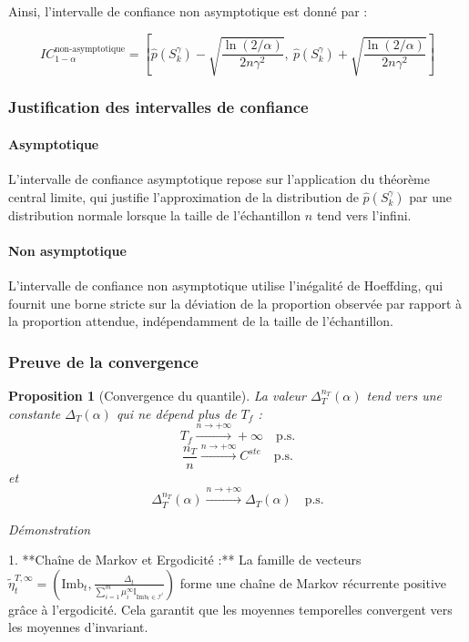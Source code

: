\documentclass[12pt,a4paper]{article}
\newtheorem{proposition}[theorem]{Proposition}
\theoremstyle{definition}
\theoremstyle{remark}
\begin{document}
Ainsi, l'intervalle de confiance non asymptotique est donné par :

$$
IC_{1 - \alpha}^{\text{non-asymptotique}} = \left[ \hat{p}(S_k^{\gamma}) - \sqrt{\frac{\ln(2/\alpha)}{2 n \gamma^2}}, \ \hat{p}(S_k^{\gamma}) + \sqrt{\frac{\ln(2/\alpha)}{2 n \gamma^2}} \right]
$$

\subsubsection{Justification des intervalles de confiance}

\paragraph{Asymptotique} L'intervalle de confiance asymptotique repose sur l'application du théorème central limite, qui justifie l'approximation de la distribution de $\hat{p}(S_k^{\gamma})$ par une distribution normale lorsque la taille de l'échantillon $n$ tend vers l'infini.

\paragraph{Non asymptotique} L'intervalle de confiance non asymptotique utilise l'inégalité de Hoeffding, qui fournit une borne stricte sur la déviation de la proportion observée par rapport à la proportion attendue, indépendamment de la taille de l'échantillon.

\subsubsection{Preuve de la convergence}

\begin{proposition}[Convergence du quantile]
La valeur $\Delta_T^{n_T}(\alpha)$ tend vers une constante $\Delta_T(\alpha)$ qui ne dépend plus de $T_f$ :
$$
T_f \xrightarrow{n \to +\infty} +\infty \quad \text{p.s.}
$$
$$
\frac{n_T}{n} \xrightarrow{n \to +\infty} C^{ste} \quad \text{p.s.}
$$
et
$$
\Delta_T^{n_T}(\alpha) \xrightarrow{n \to +\infty} \Delta_T(\alpha) \quad \text{p.s.}
$$
\end{proposition}

\textit{Démonstration}

1. **Chaîne de Markov et Ergodicité :** 
   La famille de vecteurs $\tilde{\eta}_t^{T,\infty} = \left(\text{Imb}_t, \frac{\Delta_t}{\sum_{i=1}^m \mu_i^{\infty} \mathbb{I}_{\text{Imb}_t \in \mathcal{I}^{i}}}\right)$ forme une chaîne de Markov récurrente positive grâce à l'ergodicité. Cela garantit que les moyennes temporelles convergent vers les moyennes d'invariant.
\end{document}
